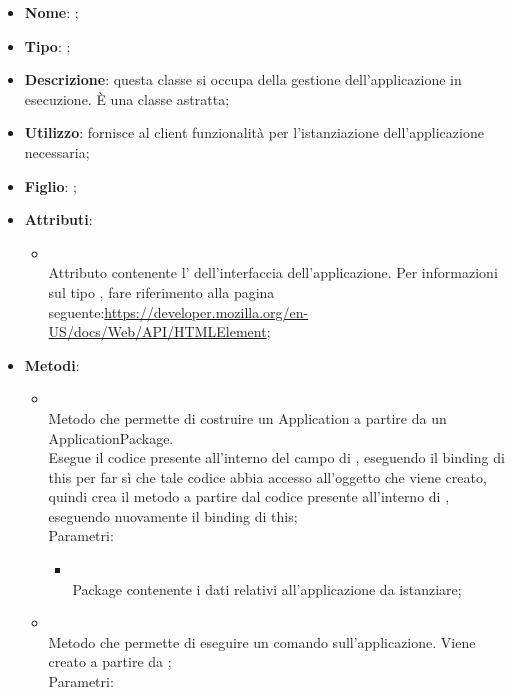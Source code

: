 \begin{itemize}
	\item \textbf{Nome}: ;
	\item \textbf{Tipo}: ;
	\item \textbf{Descrizione}: questa classe si occupa della gestione dell'applicazione in esecuzione. È una classe astratta;
	\item \textbf{Utilizzo}: fornisce al client funzionalità per l'istanziazione dell'applicazione necessaria;
	\item \textbf{Figlio}: ;
	\item \textbf{Attributi}:
	\begin{itemize}
		\item[]  \\
		Attributo contenente l' dell'interfaccia dell'applicazione. Per informazioni sul tipo , fare riferimento alla pagina seguente:\url{https://developer.mozilla.org/en-US/docs/Web/API/HTMLElement};
	\end{itemize}
	\item \textbf{Metodi}:
	\begin{itemize}
		\item[]  \\
		Metodo che permette di costruire un Application a partire da un ApplicationPackage. \\
Esegue il codice presente all'interno del campo  di , eseguendo il binding di this per far sì che tale codice abbia accesso all'oggetto che viene creato, quindi crea il metodo  a partire dal codice presente all'interno di , eseguendo nuovamente il binding di this;\\
		Parametri:
		\begin{itemize}
			\item {} \\
			Package contenente i dati relativi all'applicazione da istanziare;
		\end{itemize}
		\item[]  \\
		Metodo che permette di eseguire un comando sull'applicazione. Viene creato a partire da ;\\
		Parametri:
		\begin{itemize}

\end{itemize}
\end{itemize}
\end{itemize}
